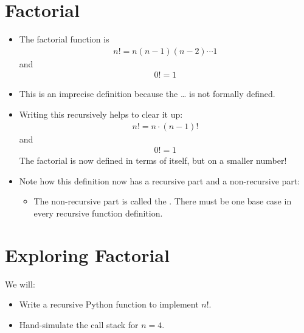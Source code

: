 \documentclass[letterpaper,10pt,english]{sphinxmanual}
\begin{document}
\section{Factorial}
\label{\detokenize{lecture_notes/lec23_recursion:factorial}}\begin{itemize}
\item {} 
The factorial function is
\begin{equation*}
\begin{split}n! = n (n-1) (n-2) \cdots 1\end{split}
\end{equation*}
and
\begin{equation*}
\begin{split}0! = 1\end{split}
\end{equation*}
\item {} 
This is an imprecise definition because the … is not
formally defined.

\item {} 
Writing this recursively helps to clear it up:
\begin{equation*}
\begin{split}n! = n \cdot (n-1)!\end{split}
\end{equation*}
and
\begin{equation*}
\begin{split}0! = 1\end{split}
\end{equation*}
The factorial is now defined in terms of itself, but on a smaller
number!

\item {} 
Note how this definition now has a recursive part and a non-recursive
part:
\begin{itemize}
\item {} 
The non-recursive part is called the . There must be
 one base case in every recursive function definition.

\end{itemize}

\end{itemize}


\section{Exploring Factorial}
\label{\detokenize{lecture_notes/lec23_recursion:exploring-factorial}}
We will:
\begin{itemize}
\item {} 
Write a recursive Python function to implement \(n!\).

\item {} 
Hand-simulate the call stack for \(n=4\).

\end{itemize}
\end{document}
